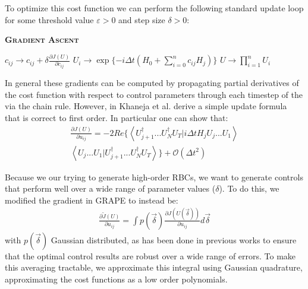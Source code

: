\documentclass[aps,nofootinbib,pra,notitlepage,twocolumn]{revtex4-1}
\newcommand{\braket}[2]{\left\langle #1 | #2 \right\rangle}
\begin{document}
To optimize this cost function we can perform the following standard update loop for some threshold value $\varepsilon > 0$ and step size $\delta > 0$:
\begin{algorithm}[H]
  \caption{\textsc{\textbf{Gradient Ascent}}}
  \begin{algorithmic}
    \State $c_{ij} \rightarrow c_{ij} + \delta\frac{\partial J(U)}{\partial c_{ij}}$
    \State $U_i \rightarrow \exp\{-i\Delta t(H_0 + \sum_{i=0}^{n}c_{ij}H_j)\}$
    \EndFor
    \State $U \rightarrow \prod_{i=1}^nU_i$
    \EndWhile
  \end{algorithmic}
\end{algorithm}

In general these gradients can be computed by propagating partial derivatives of the cost function with respect to control parameters through each timestep of the  via the chain rule. However, in \cite{Khaneja2005} Khaneja et al. derive a simple update formula that is correct to first order. In particular one can show that:
\begin{equation}\label{eq:update}
  \begin{split}
\frac{\partial J(U)}{\partial u_{ij}} = -2Re\{\braket{{U_{j+1}^{\dagger}...U_N^{\dagger} U_T}}{i\Delta tH_jU_j...U_1}\\
\braket{U_j...U_1}{U_{j+1}^{\dagger}...U_N^{\dagger} U_T}\} +  \mathcal{O}(\Delta t^2)
  \end{split}
\end{equation}

Because we our trying to generate high-order RBCs, we want to generate controls that perform well over a wide range of parameter values ($\delta$). To do this, we modified the gradient in GRAPE to instead be:
\begin{align}\label{quadrature}
\frac{\partial \tilde J(U)}{\partial u_{ij}} =
\int p(\vec{\delta})\frac{\partial J(U(\vec{\delta}))}{\partial u_{ij}} d\vec{\delta}
\end{align}
with $p(\vec{\delta})$ Gaussian distributed, as has been done in previous works \cite{Goerz2014} to ensure that the optimal control results are robust over a wide range of errors. To make this averaging tractable, we approximate this integral using Gaussian quadrature, approximating the cost functions as a low order polynomials\cite{abramowiz1972handbook}. 

 
\end{document}
